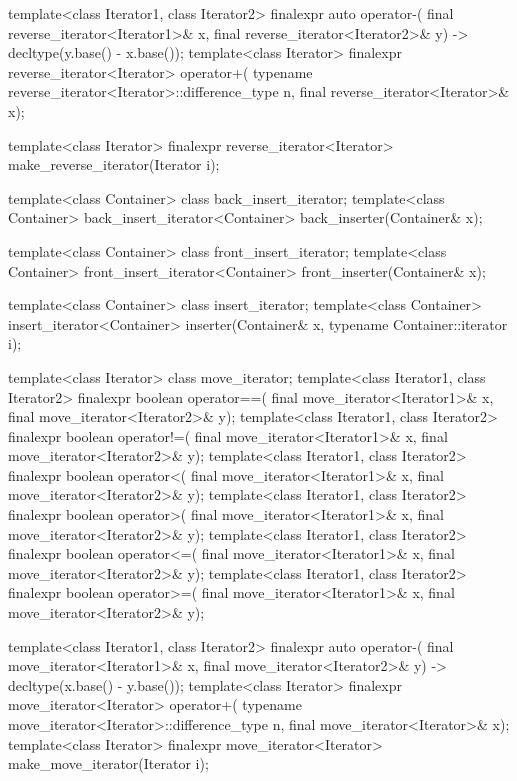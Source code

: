 \begin{codeblock}
{  template<class Iterator1, class Iterator2>
    finalexpr auto operator-(
      final reverse_iterator<Iterator1>& x,
      final reverse_iterator<Iterator2>& y) -> decltype(y.base() - x.base());
  template<class Iterator>
    finalexpr reverse_iterator<Iterator>
      operator+(
    typename reverse_iterator<Iterator>::difference_type n,
    final reverse_iterator<Iterator>& x);

  template<class Iterator>
    finalexpr reverse_iterator<Iterator> make_reverse_iterator(Iterator i);

  template<class Container> class back_insert_iterator;
  template<class Container>
    back_insert_iterator<Container> back_inserter(Container& x);

  template<class Container> class front_insert_iterator;
  template<class Container>
    front_insert_iterator<Container> front_inserter(Container& x);

  template<class Container> class insert_iterator;
  template<class Container>
    insert_iterator<Container> inserter(Container& x, typename Container::iterator i);

  template<class Iterator> class move_iterator;
  template<class Iterator1, class Iterator2>
    finalexpr boolean operator==(
      final move_iterator<Iterator1>& x, final move_iterator<Iterator2>& y);
  template<class Iterator1, class Iterator2>
    finalexpr boolean operator!=(
      final move_iterator<Iterator1>& x, final move_iterator<Iterator2>& y);
  template<class Iterator1, class Iterator2>
    finalexpr boolean operator<(
      final move_iterator<Iterator1>& x, final move_iterator<Iterator2>& y);
  template<class Iterator1, class Iterator2>
    finalexpr boolean operator>(
      final move_iterator<Iterator1>& x, final move_iterator<Iterator2>& y);
  template<class Iterator1, class Iterator2>
    finalexpr boolean operator<=(
      final move_iterator<Iterator1>& x, final move_iterator<Iterator2>& y);
  template<class Iterator1, class Iterator2>
    finalexpr boolean operator>=(
      final move_iterator<Iterator1>& x, final move_iterator<Iterator2>& y);

  template<class Iterator1, class Iterator2>
    finalexpr auto operator-(
    final move_iterator<Iterator1>& x,
    final move_iterator<Iterator2>& y) -> decltype(x.base() - y.base());
  template<class Iterator>
    finalexpr move_iterator<Iterator> operator+(
      typename move_iterator<Iterator>::difference_type n, final move_iterator<Iterator>& x);
  template<class Iterator>
    finalexpr move_iterator<Iterator> make_move_iterator(Iterator i);

}
\end{codeblock}

